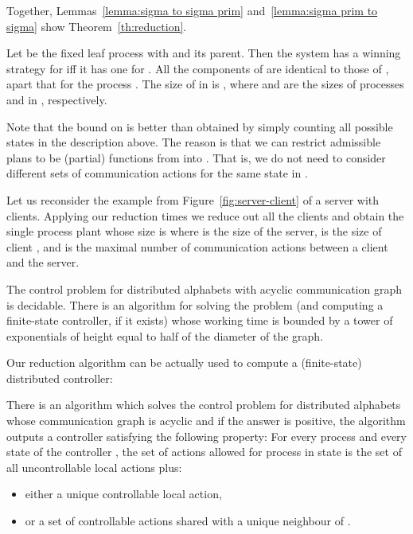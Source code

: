 \documentclass{llncs}
\begin{document}
Together, Lemmas~\ref{lemma:sigma to sigma prim} and~\ref{lemma:sigma prim to
  sigma} show Theorem~\ref{th:reduction}.


\begin{theorem}\label{th:reduction}
  Let  be the fixed leaf process with 
  and  its parent.  Then the system has a winning strategy for  iff it
  has one for . All the components of 
  are identical to those of , apart that for the process . The
  size of  in  is , where  and
   are the sizes of processes  and  in , respectively.
\end{theorem}

\begin{remark} Note that the bound on  is better than  obtained by simply counting all
possible states in the description above. 
The reason is that we can restrict admissible plans to be (partial)
functions from  into . 
That is, we do not need to consider different
sets of communication actions for the same state in .
\end{remark}

Let us reconsider the example from Figure~\ref{fig:server-client} of a
server with  clients. Applying our reduction  times we reduce
out all the clients and obtain the single process plant whose size is
 where 
is the size of the server,  is the size of client , and  is
the maximal number of communication actions between a client and the
server.



\begin{theorem}\label{th:main}
  The control problem for distributed alphabets with acyclic communication
  graph is decidable. There is an algorithm for solving
  the problem (and computing a finite-state controller, if it exists) whose
  working time is bounded by a tower of exponentials of height equal
  to half of the diameter of the graph. 
\end{theorem}






Our reduction algorithm  can be actually used to compute a (finite-state)
distributed controller:

\begin{corollary}
  There is an algorithm which solves the control problem for
  distributed alphabets whose communication graph is acyclic and if
  the answer is positive, the algorithm outputs a controller
  satisfying the following property: For every process  and every
  state  of the controller , the set of actions allowed for
  process  in state  is the set of all uncontrollable local
  actions plus:
\begin{itemize}
  \item either a unique controllable local action,
  \item or a set of controllable actions shared with a unique neighbour 
  of .
\end{itemize} 
\end{corollary}
\end{document}

